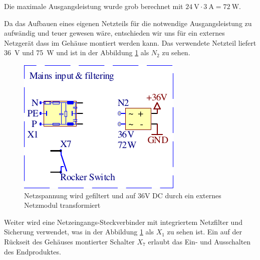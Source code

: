 Die  maximale Ausgangsleistung wurde grob berechnet  mit  $\SI{24}{\volt}  \cdot
\SI{3}{\ampere} = \SI{72}{\watt}$.

Da das Aufbauen eines eigenen Netzteils f\"ur die notwendige Ausgangsleistung zu
aufw\"andig und  teuer  gewesen  w\"are,  entschieden wir uns f\"ur ein externes
Netzger\"at  dass  im  Geh\"ause  montiert werden kann. Das verwendete  Netzteil
liefert   \SI{36}{\volt}   und   \SI{75}{\watt}  und  ist   in   der   Abbildung
\ref{fig:circuit:mains-input} als $N_2$ zu sehen.

\begin{figure}[th!]
    \center
    \includegraphics[width=.35\textwidth]{images/circuit/mains-input.pdf}
    \caption{Netzspannung wird gefiltert und auf 36V DC durch ein externes Netzmodul transformiert}
    \label{fig:circuit:mains-input}
\end{figure}

Weiter  wird  eine  Netzeingangs-Steckverbinder  mit integriertem Netzfilter und
Sicherung  verwendet,  was  in der Abbildung  \ref{fig:circuit:mains-input}  als
$X_1$  zu  sehen  ist. Ein auf der R\"uckseit des Geh\"auses montierter Schalter
$X_7$ erlaubt das Ein- und Ausschalten des Endproduktes.

